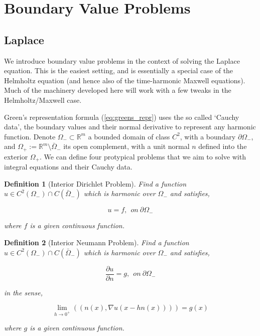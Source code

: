 \documentclass[12pt, a4, twoside]{article}
\newtheorem{definition}{Definition}[section]
\begin{document}
\section{Boundary Value Problems}

\subsection{Laplace}

We introduce boundary value problems in the context of solving the Laplace equation. This is the easiest setting, and is essentially a special case of the Helmholtz equation (and hence also of the time-harmonic Maxwell equations). Much of the machinery developed here will work with a few tweaks in the Helmholtz/Maxwell case.

Green's representation formula (\ref{eq:greens_repr}) uses the so called `Cauchy data', the boundary values and their normal derivative to represent any harmonic function. Denote $\Omega_- \subset \mathbb{R}^m$ a bounded domain of class $C^2$, with a boundary $\partial \Omega_-$, and $\Omega_+ := \mathbb{R}^m \setminus \bar{\Omega}_-$ its open complement, with a unit normal $n$ defined into the exterior $\Omega_+$. We can define four protypical problems that we aim to solve with integral equations and their Cauchy data.

\begin{definition}[Interior Dirichlet Problem]
    \label{def:int_dir_prob}
    Find a function $u \in C^2(\Omega_-) \cap C(\bar{\Omega}_-)$ which is harmonic over $\Omega_-$ and satisfies,

    $$ u = f, \> \> on \> \partial \Omega_- $$ 

    where $f$ is a given continuous function.

\end{definition}

\begin{definition}[Interior Neumann Problem]
    \label{def:int_neu_prob}
    Find a function $u \in C^2(\Omega_-) \cap C(\bar{\Omega}_-)$ which is harmonic over $\Omega_-$ and satisfies,

    $$ \frac{\partial u}{\partial n} = g, \> \> on \>  \partial \Omega_- $$ 

    in the sense,

    $$ \lim_{h \rightarrow 0^+} ((n(x), \nabla u(x-hn(x)))) = g(x) $$

    where $g$ is a given continuous function.

\end{definition}
\end{document}
